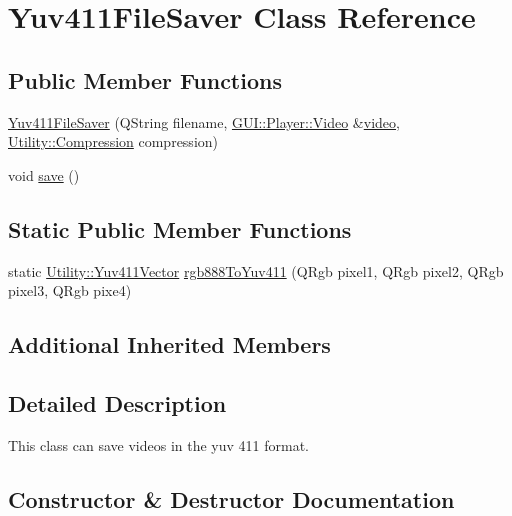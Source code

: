 \hypertarget{classUtility_1_1Yuv411FileSaver}{}\section{Yuv411\+File\+Saver Class Reference}
\label{classUtility_1_1Yuv411FileSaver}
\subsection*{Public Member Functions}
\begin{DoxyCompactItemize}
\item 
\hyperlink{classUtility_1_1Yuv411FileSaver_a1ef1cdb086ab0a90dbbbf402ff0b2e7d}{Yuv411\+File\+Saver} (Q\+String filename, \hyperlink{classGUI_1_1Player_1_1Video}{G\+U\+I\+::\+Player\+::\+Video} \&\hyperlink{classUtility_1_1YuvFileSaver_ac39cb6d0a56308ca6323374fc0d74c96}{video}, \hyperlink{namespaceUtility_a56a83bf6847f4801f4205eb4be237ccf}{Utility\+::\+Compression} compression)
\item 
void \hyperlink{classUtility_1_1Yuv411FileSaver_aae2c382151ef7c9aa913361172b30db6}{save} ()
\end{DoxyCompactItemize}
\subsection*{Static Public Member Functions}
\begin{DoxyCompactItemize}
\item 
static \hyperlink{classUtility_1_1Yuv411Vector}{Utility\+::\+Yuv411\+Vector} \hyperlink{classUtility_1_1Yuv411FileSaver_aa92efa9b4eb22a7e2afff2e806397524}{rgb888\+To\+Yuv411} (Q\+Rgb pixel1, Q\+Rgb pixel2, Q\+Rgb pixel3, Q\+Rgb pixe4)
\end{DoxyCompactItemize}
\subsection*{Additional Inherited Members}


\subsection{Detailed Description}
This class can save videos in the yuv 411 format. 

\subsection{Constructor \& Destructor Documentation}
\hypertarget{classUtility_1_1Yuv411FileSaver_a1ef1cdb086ab0a90dbbbf402ff0b2e7d}{}

